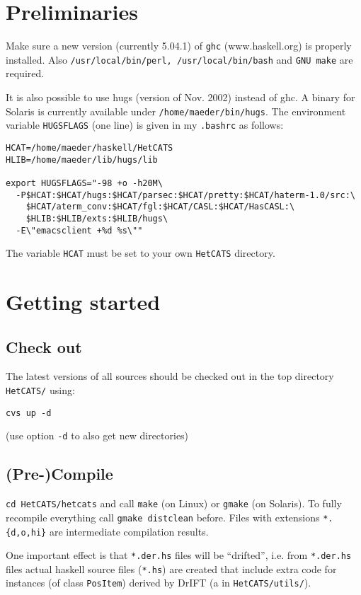\documentclass{article}
\begin{document}
\section{Preliminaries}

Make sure a new version (currently 5.04.1) of \texttt{ghc}
(www.haskell.org) is properly installed.  Also
\texttt{/usr/local/bin/perl, /usr/local/bin/bash} and \texttt{GNU
  make} are required.

It is also possible to use hugs (version of Nov. 2002) instead of ghc.
A binary for Solaris is currently available under
\texttt{/home/maeder/bin/hugs}.  The environment variable
\texttt{HUGSFLAGS} (one line) is given in my \texttt{.bashrc} as follows:

\begin{verbatim}
HCAT=/home/maeder/haskell/HetCATS
HLIB=/home/maeder/lib/hugs/lib

export HUGSFLAGS="-98 +o -h20M\
  -P$HCAT:$HCAT/hugs:$HCAT/parsec:$HCAT/pretty:$HCAT/haterm-1.0/src:\
    $HCAT/aterm_conv:$HCAT/fgl:$HCAT/CASL:$HCAT/HasCASL:\
    $HLIB:$HLIB/exts:$HLIB/hugs\
  -E\"emacsclient +%d %s\""
\end{verbatim}

The variable \texttt{HCAT} must be set to your own \texttt{HetCATS} directory.

\section{Getting started}

\subsection{Check out}
The latest versions of all sources should be checked out in the top
directory \texttt{HetCATS/} using:

\texttt{cvs up -d}

(use option \texttt{-d} to also get new directories)

\subsection{(Pre-)Compile}

\texttt{cd HetCATS/hetcats} and call \texttt{make} (on Linux) or
\texttt{gmake} (on Solaris). To fully recompile everything call
\texttt{gmake distclean} before. Files with extensions
\texttt{*.\{d,o,hi\}} are intermediate compilation results.

One important effect is that \texttt{*.der.hs} files will be
``drifted'', i.e.  from \texttt{*.der.hs} files actual haskell source
files (\texttt{*.hs}) are created that include extra code for
instances (of class \texttt{PosItem}) derived by DrIFT (a in
\texttt{HetCATS/utils/}).
\end{document}
